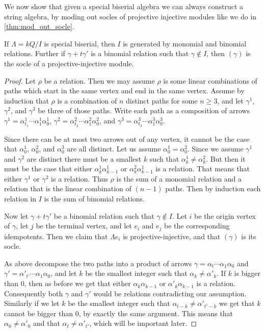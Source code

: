 We now show that given a special biserial algebra we can always construct a string algebra, by moding out socles of projective injective modules like we do in \cref{thm:mod_out_socle}.

\begin{prop}\label{prop:special_biserail_algerbas_are_binomial}
	If $\Lambda = kQ/I$ is special biserial, then $I$ is generated by monomial and binomial relations. Further if $\gamma + t\gamma'$ is a binomial relation such that $\gamma \not\in I$, then $(\gamma)$ is the socle of a projective-injective module.
	\begin{proof}
		Let $\rho$ be a relation. Then we may assume $\rho$ is some linear combinations of paths which start in the same vertex and end in the same vertex. Assume by induction that $\rho$ is a combination of $n$ distinct paths for some $n\geq 3$, and let $\gamma^1$, $\gamma^2$, and $\gamma^3$ be three of those paths. Write each path as a composition of arrows $\gamma^1 = \alpha^1_{t_1} \cdots \alpha^1_1\alpha^1_0$,  $\gamma^2 = \alpha^2_{t_2} \cdots \alpha^2_1\alpha^2_0$, and  $\gamma^3 = \alpha^3_{t_3} \cdots \alpha^3_1\alpha^3_0$.
		
		Since there can be at most two arrows out of any vertex, it cannot be the case that $\alpha^1_0$, $\alpha^2_0$, and $\alpha^3_0$ are all distinct. Let us assume $\alpha^1_0 = \alpha^2_0$. Since we assume $\gamma^1$ and $\gamma^2$ are distinct there must be a smallest $k$ such that $\alpha^1_k \neq \alpha^2_k$. But then it must be the case that either $\alpha^1_k\alpha^1_{k-1}$ or $\alpha^2_k\alpha^1_{k-1}$ is a relation. That means that either $\gamma^1$ or $\gamma^2$ is a relation. Thus $\rho$ is the sum of a monomial relation and a relation that is the linear combination of $(n-1)$ paths. Then by induction each relation in $I$ is the sum of binomial relations.
		
		Now let $\gamma + t\gamma'$ be a binomial relation such that $\gamma \not\in I$. Let $i$ be the origin vertex of $\gamma$, let $j$ be the terminal vertex, and let $e_i$ and $e_j$ be the corresponding idempotents. Then we claim that $\Lambda e_i$ is projective-injective, and that $(\gamma)$ is its socle.
		
		As above decompose the two paths into a product of arrows $\gamma = \alpha_{t}\cdots \alpha_1\alpha_0$ and $\gamma' = \alpha'_{t'}\cdots \alpha_1\alpha_0$, and let $k$ be the smallest integer such that $\alpha_k \neq \alpha'_k$. If $k$ is bigger than 0, then as before we get that either $\alpha_k\alpha_{k-1}$ or $\alpha'_k\alpha_{k-1}$ is a relation. Consequently both $\gamma$ and $\gamma'$ would be relations contradicting our assumption. Similarly if we let $k$ be the smallest integer such that $\alpha_{t-k} \neq \alpha'_{t'-k}$ we get that $k$ cannot be bigger than 0, by exactly the same argument. This means that $\alpha_0 \neq \alpha'_0$ and that $\alpha_t \neq \alpha'_{t'}$, which will be important later.


\end{proof}
\end{prop}
